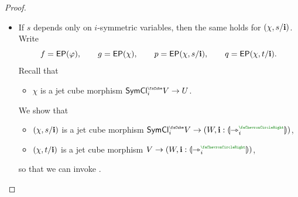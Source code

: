 \documentclass[a4paper]{memoir}
\begin{document}
\begin{proof}
\begin{itemize}
\begin{itemize}
\begin{itemize}
				Then we can proceed depending on the situation:
				\begin{itemize}
					\item If $\vfi = (\chi, t \vee \dm i) : (V_0, \dm i : \rival{\jet_i\pmr{\ypolar}}) \to (U, \dm i : \rival{\jet_i\pmr{\ypolar}})$,
					then we can use .
					\item If $\vfi = (\chi, t \wedge \dm i) : (V_0, \dm i : \rival{\jet_i\pmr{\ypolar}}) \to (U, \dm i : \rival{\jet_i\pmr{\ypolar}})$,
					then we can use .
					\item If $\vfi = (\chi, t \vee \lnot \dm i) : (V_0, \dm i : \rival{\tej_i\pmr{\ypolar}}) \to (U, \dm i : \rival{\jet_i\pmr{\ypolar}})$,
					then we can use .
					\item If $\vfi = (\chi, t \wedge \lnot \dm i) : (V_0, \dm i : \rival{\tej_i\pmr{\ypolar}}) \to (U, \dm i : \rival{\jet_i\pmr{\ypolar}})$,
					then we can use .
				\end{itemize}
				Thus, we can invoke one of the rules , \allowbreak {}, , .\footnote{Recall that we assume that the last variable in $W$ is $\dm i : \rival{\jet_i\pmr{\ypolar}}$, i.e.\ we can instantiate the connection rules with $Q = \jetsym$.}
				
				\item If $s$ depends only on $i$-symmetric variables, then the same holds for $(\chi, s / \mathbf{i})$. Write
				\[
					f = \mathsf{EP}(\varphi), \qquad
					g = \mathsf{EP}(\chi), \qquad
					p = \mathsf{EP}(\chi, s/\mathbf{i}), \qquad
					q = \mathsf{EP}(\chi, t/\mathbf{i}).
				\]
				Recall that
				\begin{itemize}
					\item $\chi$ is a jet cube morphism $\UFsymcube_i V \to U$.
				\end{itemize}
				We show that
				\begin{itemize}
					\item $(\chi, s / \mathbf{i})$ is a jet cube morphism $\UFsymcube_i V \to (W, \dm i : \rival{\jet_i\pmr{\ypolar}})$,
					\item $(\chi, t / \mathbf{i})$ is a jet cube morphism $V \to (W, \dm i : \rival{\jet_i\pmr{\ypolar}})$,
				\end{itemize}
				so that we can invoke .
				

\end{itemize}
\end{itemize}
\end{itemize}
\end{proof}
\end{document}

